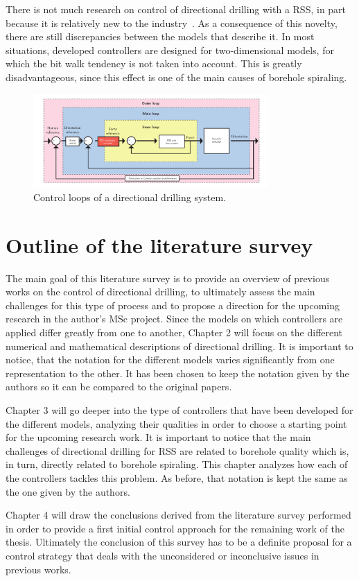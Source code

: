 There is not much research on control of directional drilling with a \acs{RSS}, in part because it is relatively new to the industry~\cite{Downton2000}. As a consequence of this novelty, there are still discrepancies between the models that describe it. In most situations, developed controllers are designed for two-dimensional models, for which the bit walk tendency is not taken into account. This is greatly disadvantageous, since this effect is one of the main causes of borehole spiraling.

\begin{figure}[ht]\centering
	\includegraphics[width=0.8\textwidth]{img/controlloops.pdf}
	\caption{\label{fig:controlloops}Control loops of a directional drilling system.}
\end{figure}

\section{Outline of the literature survey}
The main goal of this literature survey is to provide an overview of previous works on the control of directional drilling, to ultimately assess the main challenges for this type of process and to propose a direction for the upcoming research in the author's MSc project. Since the models on which controllers are applied differ greatly from one to another, Chapter 2 will focus on the different numerical and mathematical descriptions of directional drilling. It is important to notice, that the notation for the different models varies significantly from one representation to the other. It has been chosen to keep the notation given by the authors so it can be compared to the original papers.

 Chapter 3 will go deeper into the type of controllers that have been developed for the different models, analyzing their qualities in order to choose a starting point for the upcoming research work. It is important to notice that the main challenges of directional drilling for \acs{RSS} are related to borehole quality which is, in turn, directly related to borehole spiraling. This chapter analyzes how each of the controllers tackles this problem. As before, that notation is kept the same as the one given by the authors.
 
 Chapter 4 will draw the conclusions derived from the literature survey performed in order to provide a first initial control approach for the remaining work of the thesis. Ultimately the conclusion of this survey has to be a definite proposal for a control strategy that deals with the unconsidered or inconclusive issues in previous works.
 

 
 


